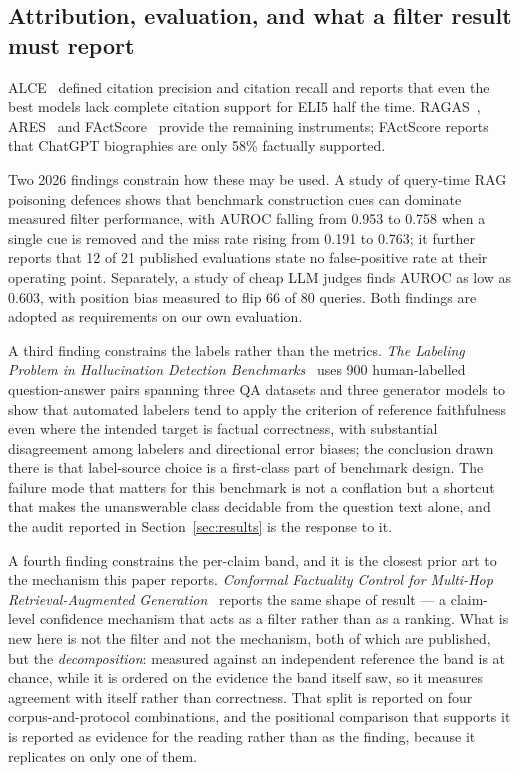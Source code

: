 \documentclass[preprint,3p,times]{elsarticle}
\begin{document}
\subsection{Attribution, evaluation, and what a filter result must report}

ALCE~\cite{gao2023alce} defined citation precision and citation recall and
reports that even the best models lack complete citation support for ELI5 half
the time. RAGAS~\cite{es2024ragas}, ARES~\cite{saadfalcon2024ares} and
FActScore~\cite{min2023factscore} provide the remaining instruments;
FActScore reports that ChatGPT biographies are only 58\% factually supported.

Two 2026 findings constrain how these may be used. A study of query-time RAG
poisoning defences shows that benchmark construction cues can dominate measured
filter performance, with AUROC falling from 0.953 to 0.758 when a single cue
is removed and the miss rate rising from 0.191 to 0.763; it further reports
that 12 of 21 published evaluations state no false-positive rate at their
operating point. Separately, a study of cheap LLM judges finds AUROC as low as
0.603, with position bias measured to flip 66 of 80 queries. Both findings are
adopted as requirements on our own evaluation.

A third finding constrains the labels rather than the metrics. \emph{The
Labeling Problem in Hallucination Detection Benchmarks}~\cite{valjakka2026labeling}
uses 900 human-labelled question-answer pairs spanning three QA datasets and
three generator models to show that automated labelers tend to apply the
criterion of reference faithfulness even where the intended target is factual
correctness, with substantial disagreement among labelers and directional error
biases; the conclusion drawn there is that label-source choice is a
first-class part of benchmark design. The failure mode that matters for this
benchmark is not a conflation but a shortcut that makes the unanswerable class
decidable from the question text alone, and the audit reported in
Section~\ref{sec:results} is the response to it.

A fourth finding constrains the per-claim band, and it is the closest prior
art to the mechanism this paper reports. \emph{Conformal Factuality Control
for Multi-Hop Retrieval-Augmented Generation}~\cite{rehman2026conformal}
reports the same shape of result --- a claim-level confidence mechanism that
acts as a filter rather than as a ranking. What is new here is not the filter
and not the mechanism, both of which are published, but the
\emph{decomposition}: measured against an independent reference the band is at
chance, while it is ordered on the evidence the band itself saw, so it
measures agreement with itself rather than correctness. That split is
reported on four corpus-and-protocol combinations, and the positional
comparison that supports it is reported as evidence for the reading rather
than as the finding, because it replicates on only one of them.
\end{document}
